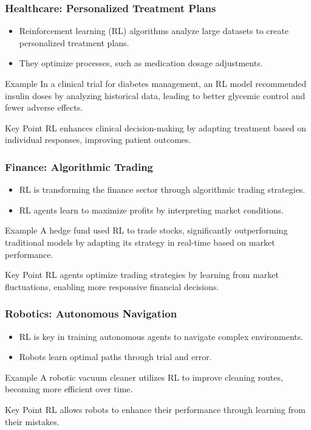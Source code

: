 \documentclass{beamer}
\begin{document}
\begin{frame}[fragile]
    \frametitle{Healthcare: Personalized Treatment Plans}
    \begin{itemize}
        \item Reinforcement learning (RL) algorithms analyze large datasets to create personalized treatment plans.
        \item They optimize processes, such as medication dosage adjustments.
    \end{itemize}
    \begin{block}{Example}
        In a clinical trial for diabetes management, an RL model recommended insulin doses by analyzing historical data, leading to better glycemic control and fewer adverse effects.
    \end{block}
    \begin{block}{Key Point}
        RL enhances clinical decision-making by adapting treatment based on individual responses, improving patient outcomes.
    \end{block}
\end{frame}

\begin{frame}[fragile]
    \frametitle{Finance: Algorithmic Trading}
    \begin{itemize}
        \item RL is transforming the finance sector through algorithmic trading strategies.
        \item RL agents learn to maximize profits by interpreting market conditions.
    \end{itemize}
    \begin{block}{Example}
        A hedge fund used RL to trade stocks, significantly outperforming traditional models by adapting its strategy in real-time based on market performance.
    \end{block}
    \begin{block}{Key Point}
        RL agents optimize trading strategies by learning from market fluctuations, enabling more responsive financial decisions.
    \end{block}
\end{frame}

\begin{frame}[fragile]
    \frametitle{Robotics: Autonomous Navigation}
    \begin{itemize}
        \item RL is key in training autonomous agents to navigate complex environments.
        \item Robots learn optimal paths through trial and error.
    \end{itemize}
    \begin{block}{Example}
        A robotic vacuum cleaner utilizes RL to improve cleaning routes, becoming more efficient over time.
    \end{block}
    \begin{block}{Key Point}
        RL allows robots to enhance their performance through learning from their mistakes.
    \end{block}
\end{frame}
\end{document}
